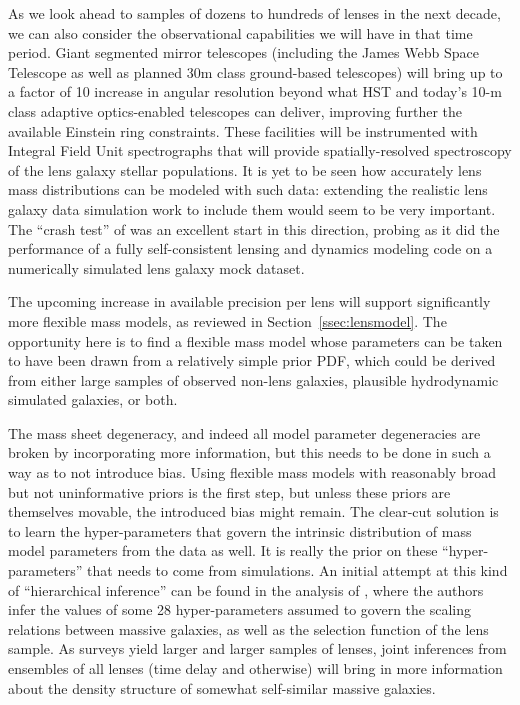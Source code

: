 As we look ahead to samples of dozens to hundreds of lenses in the
next decade, we can also consider the observational capabilities we
will have in that time period. Giant segmented mirror telescopes
(including the James Webb Space Telescope as well as planned 30m class
ground-based telescopes) will bring up to a factor of 10 increase in
angular resolution beyond what HST and today's 10-m class adaptive
optics-enabled telescopes can deliver, improving further the available
Einstein ring constraints. These facilities will be instrumented with
Integral Field Unit spectrographs that will provide
spatially-resolved spectroscopy of the lens galaxy stellar populations.
It is yet to be seen how accurately lens mass distributions can be
modeled with such data: extending the realistic lens galaxy data
simulation work to include them would seem to be very important. The
``crash test'' of \citet{Bar++09a} was an excellent start in this
direction, probing as it did the performance of a fully self-consistent
lensing and dynamics modeling code on a numerically simulated lens
galaxy mock dataset.

The upcoming increase in available precision per lens will support
significantly more flexible mass models, as reviewed in
Section~\ref{ssec:lensmodel}.
The opportunity here is to find a flexible mass model whose parameters
can be taken to have been drawn from a relatively simple prior PDF,
which could be derived from either large samples of observed non-lens
galaxies, plausible hydrodynamic simulated galaxies, or both.


The mass sheet degeneracy, and indeed all model parameter degeneracies
are broken by incorporating more information, but this needs to be
done in such a way as to not introduce bias. Using flexible mass
models with reasonably broad but not uninformative priors is the first
step, but unless these priors are themselves movable, the introduced
bias might remain. The clear-cut solution is to learn the
hyper-parameters that govern the intrinsic distribution of mass model
parameters from the data as well. It is really the prior on these
``hyper-parameters'' that needs to come from simulations. An initial
attempt at this kind of ``hierarchical inference'' can be found in
the analysis of \citet{SonnenfeldEtal2015}, where the authors infer
the values of some 28 hyper-parameters assumed to govern the scaling
relations between massive galaxies, as well as the selection function
of the lens sample. As surveys yield larger and larger samples of
lenses, joint inferences from ensembles
of all lenses (time delay and otherwise) will bring in more
information about the density structure of somewhat self-similar
massive galaxies.

